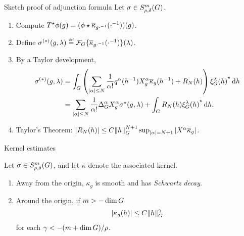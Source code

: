 \documentclass{beamer}
\begin{document}
\begin{frame}{Sketch proof of adjunction formula \cite{FischerRuzhansky16}}
    Let $\sigma \in \SymbolClass m {\rho, \delta}$.
    \begin{enumerate}
        \item Compute $\adj T \phi(g) = (\conv \phi {\conj \kappa_{g \dummy^{-1}}}(\dummy^{-1}))(g)$.
            \pause
        \item Define $\sigma^{(*)}(g, \lambda) \defeq \Fourier \{ \conj \kappa_{g \dummy^{-1}}(\dummy^{-1}) \}(\lambda)$.
            \pause
        \item By a Taylor development,
            \begin{align*}
                \sigma^{(*)}(g, \lambda)
                &= \int_\Group \left(\sum_{\abs \alpha \leq N} \frac 1 {\alpha !} q^\alpha(h^{-1}) \LeftDifferentialOperator [g] \alpha \conj \kappa_g(h^{-1}) + R_N(h)\right) \adj {\Rep \lambda(h)} \dd h\\
                &= \sum_{\abs \alpha \leq N} \frac 1 {\alpha !} \DifferenceOperatorOrder \alpha \LeftDifferentialOperator [g] \alpha \adj \sigma(g, \lambda) + \int_\Group R_N(h) \adj {\Rep \lambda(h)} \dd h.
            \end{align*}
            \pause
        \item
            Taylor's Theorem: $\abs {R_N(h)} \leq C \norm [\Group] h^{N + 1} \sup_{\abs \alpha = N + 1} \abs {\LeftDifferentialOperator \alpha \conj \kappa_g}$.
    \end{enumerate}
\end{frame}

\begin{frame}{Kernel estimates}
    \begin{theorem}
        Let $\sigma \in \SymbolClass m {\rho, \delta}$,
        and let $\kappa$ denote the associated kernel.

        \begin{enumerate}
            \item
                Away from the origin,
                $\kappa_g$ is smooth and has \emph{Schwartz decay}.
            \item
                Around the origin,
                if $m > -\dim \Group$
                \begin{align*}
                    \abs {\kappa_g(h)} \leq C \norm [\Group] h^{\gamma}
                \end{align*}
                for each $\gamma < -(m + \dim \Group) / \rho$.
        \end{enumerate}
    \end{theorem}
\end{frame}
\end{document}
